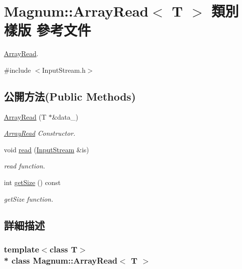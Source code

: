 \hypertarget{class_magnum_1_1_array_read}{}\section{Magnum\+:\+:Array\+Read$<$ T $>$ 類別 樣版 參考文件}
\label{class_magnum_1_1_array_read}


\hyperlink{class_magnum_1_1_array_read}{Array\+Read}.  




{\ttfamily \#include $<$Input\+Stream.\+h$>$}

\subsection*{公開方法(Public Methods)}
\begin{DoxyCompactItemize}
\item 
\hyperlink{class_magnum_1_1_array_read_a9fef052079959b6c7cf69da4e2bb2f62}{Array\+Read} (T $\ast$\&data\+\_\+)
\begin{DoxyCompactList}\small\item\em \hyperlink{class_magnum_1_1_array_read}{Array\+Read} Constructor. \end{DoxyCompactList}\item 
void \hyperlink{class_magnum_1_1_array_read_a6912629d714849c3f09256e1e5b7e7fb}{read} (\hyperlink{class_magnum_1_1_input_stream}{Input\+Stream} \&is)
\begin{DoxyCompactList}\small\item\em read function. \end{DoxyCompactList}\item 
int \hyperlink{class_magnum_1_1_array_read_ad7518f952d7ba7ce19ab429562650e24}{get\+Size} () const 
\begin{DoxyCompactList}\small\item\em get\+Size function. \end{DoxyCompactList}\end{DoxyCompactItemize}


\subsection{詳細描述}
\subsubsection*{template$<$class T$>$\\*
class Magnum\+::\+Array\+Read$<$ T $>$}


